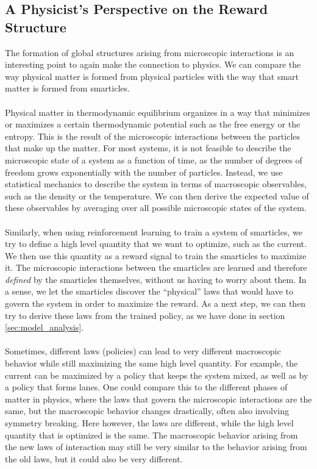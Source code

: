 \subsection{A Physicist's Perspective on the Reward Structure}
\label{sec:physics_reward_structure}
The formation of global structures arising from microscopic interactions is an interesting point to again make the connection to physics. We can compare the way physical matter is formed from physical particles with the way that smart matter is formed from smarticles. 
\\
\\
Physical matter in thermodynamic equilibrium organizes in a way that minimizes or maximizes a certain thermodynamic potential such as the free energy or the entropy. This is the result of the microscopic interactions between the particles that make up the matter. For most systems, it is not feasible to describe the microscopic state of a system as a function of time, as the number of degrees of freedom grows exponentially with the number of particles. Instead, we use statistical mechanics to describe the system in terms of macroscopic observables, such as the density or the temperature. We can then derive the expected value of these observables by averaging over all possible microscopic states of the system.
\\
\\
Similarly, when using reinforcement learning to train a system of smarticles, we try to define a high level quantity that we want to optimize, such as the current. We then use this quantity as a reward signal to train the smarticles to maximize it. The microscopic interactions between the smarticles are learned and therefore \textit{defined} by the smarticles themselves, without us having to worry about them. In a sense, we let the smarticles discover the \enquote{physical} laws that would have to govern the system in order to maximize the reward. As a next step, we can then try to derive these laws from the trained policy, as we have done in section \ref{sec:model_analysis}.
\\
\\
Sometimes, different laws (policies) can lead to very different macroscopic behavior while still maximizing the same high level quantity. For example, the current can be maximized by a policy that keeps the system mixed, as well as by a policy that forms lanes. One could compare this to the different phases of matter in physics, where the laws that govern the microscopic interactions are the same, but the macroscopic behavior changes drastically, often also involving symmetry breaking. Here however, the laws are different, while the high level quantity that is optimized is the same. The macroscopic behavior arising from the new laws of interaction may still be very similar to the behavior arising from the old laws, but it could also be very different. 
